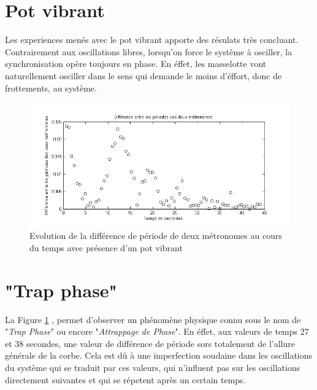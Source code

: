 \documentclass[a4paper,11pt]{report}
\begin{document}
\section{Pot vibrant}
Les experiences menés avec le pot vibrant apporte des résulats très concluant. Contrairement aux oscillations libres, lorsqu'on force le système à osciller, la synchronisation opère toujours en phase. En éffet, les masselotte vont naturellement osciller dans le sens qui demande le moins d'éffort, donc de frottements, au système.
\begin{figure}[h]
\centering
\includegraphics[width=1\textwidth]{PotVibrant_Synchro_Periode_200BPM}
\caption{Evolution de la différence de période de deux métronomes au cours du temps avec présence d'un pot vibrant}
\label{SynchroPP}
\end{figure}

\section{"Trap phase"}
La Figure \ref{SynchroPP} , permet d'observer un phénomène physique connu sous le nom de "{\it Trap Phase}" ou encore "{\it Attrappage de Phase}". En éffet, aux valeurs de temps 27 et 38 secondes, une valeur de différence de période sors totalement de l'allure générale de la corbe. Cela est dû à une imperfection soudaine dans les oscillations du système qui se traduit par ces valeurs, qui n'influent pas sur les oscillations directement suivantes et qui se répetent après un certain temps.
\end{document}

